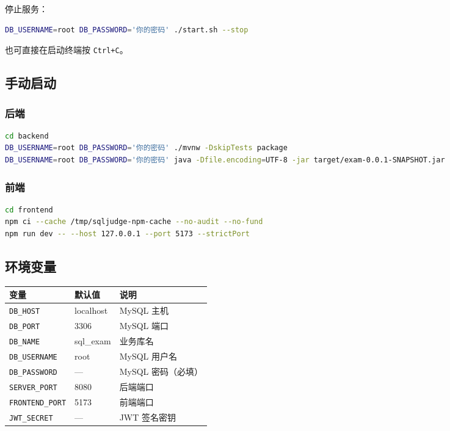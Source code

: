 \documentclass[12pt,a4paper]{ctexart}
\begin{document}
停止服务：

\begin{lstlisting}[language=bash]
DB_USERNAME=root DB_PASSWORD='你的密码' ./start.sh --stop
\end{lstlisting}

也可直接在启动终端按 \texttt{Ctrl+C}。

\subsection{手动启动}

\subsubsection*{后端}

\begin{lstlisting}[language=bash]
cd backend
DB_USERNAME=root DB_PASSWORD='你的密码' ./mvnw -DskipTests package
DB_USERNAME=root DB_PASSWORD='你的密码' java -Dfile.encoding=UTF-8 -jar target/exam-0.0.1-SNAPSHOT.jar
\end{lstlisting}

\subsubsection*{前端}

\begin{lstlisting}[language=bash]
cd frontend
npm ci --cache /tmp/sqljudge-npm-cache --no-audit --no-fund
npm run dev -- --host 127.0.0.1 --port 5173 --strictPort
\end{lstlisting}

\subsection{环境变量}

\begin{table}[h]
\centering
\begin{tabular}{lll}
\hline
变量 & 默认值 & 说明 \\
\hline
\texttt{DB\_HOST}     & localhost  & MySQL 主机 \\
\texttt{DB\_PORT}     & 3306       & MySQL 端口 \\
\texttt{DB\_NAME}     & sql\_exam   & 业务库名 \\
\texttt{DB\_USERNAME} & root       & MySQL 用户名 \\
\texttt{DB\_PASSWORD} & —          & MySQL 密码（必填） \\
\texttt{SERVER\_PORT} & 8080       & 后端端口 \\
\texttt{FRONTEND\_PORT}& 5173      & 前端端口 \\
\texttt{JWT\_SECRET}  & —          & JWT 签名密钥 \\
\hline
\end{tabular}
\end{table}
\end{document}
